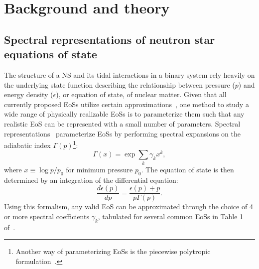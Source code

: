 \documentclass[prd,twocolumn,nofootinbib,superscriptaddress,amsmath,amssymb]{revtex4-1}
\begin{document}
\section{Background and theory}\label{sec:theory}

\subsection{Spectral representations of neutron star equations of state}\label{sec:eos}
The structure of a NS and its tidal interactions in a binary system rely heavily on the underlying state function describing the relationship between pressure ($p$) and energy density ($\epsilon$), or equation of state, of nuclear matter.
Given that all currently proposed EoSs utilize certain approximations~\cite{Oertel:Review,Baym:Review}, one method to study a wide range of physically realizable EoSs is to parameterize them such that any realistic EoS can be represented with a small number of parameters.
Spectral representations~\cite{Lindblom:2010bb,Lindblom:2012zi,Lindblom:2013kra,Lindblom:2018rfr,Abbott:2018exr} parameterize EoSs by performing spectral expansions on the adiabatic index $\Gamma(p)$\footnote{Another way of parameterizing EoSs is the piecewise polytropic formulation~\cite{Read2009,Lackey:2014fwa,Carney:2018sdv}.}:
\begin{equation}
\Gamma(x) = \exp{\sum_k\gamma_k x^k},
\end{equation}
where $x \equiv \log{p/p_0}$ for minimum pressure $p_0$.
The equation of state is then determined by an integration of the differential equation:
\begin{equation}
\frac{d \epsilon(p)}{dp}=\frac{\epsilon(p)+p}{p \Gamma(p)}.
\end{equation}
Using this formalism, any valid EoS can be approximated through the choice of 4 or more spectral coefficients $\gamma_k$, tabulated for several common EoSs in Table 1 of~\cite{Lindblom:2018rfr}.
\end{document}

